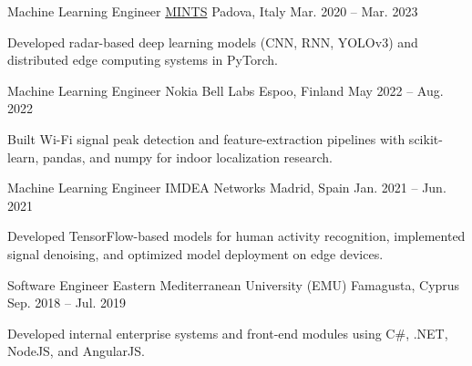 \begin{cventries}
  \cventry
    {Machine Learning Engineer} %
    {\href{https://b5g-mints.eu/}{MINTS}} %
    {Padova, Italy} %
    {Mar. 2020 -- Mar. 2023} %
    {
      \begin{cvitems}
        \item {Developed radar-based deep learning models (CNN, RNN, YOLOv3) and distributed edge computing systems in PyTorch.}
      \end{cvitems}
    }

  \cventry
    {Machine Learning Engineer} %
    {Nokia Bell Labs} %
    {Espoo, Finland} %
    {May 2022 -- Aug. 2022} %
    {
      \begin{cvitems}
        \item {Built Wi-Fi signal peak detection and feature-extraction pipelines with scikit-learn, pandas, and numpy for indoor localization research.}
      \end{cvitems}
    }

  \cventry
    {Machine Learning Engineer} %
    {IMDEA Networks} %
    {Madrid, Spain} %
    {Jan. 2021 -- Jun. 2021} %
    {
      \begin{cvitems}
        \item {Developed TensorFlow-based models for human activity recognition, implemented signal denoising, and optimized model deployment on edge devices.}
      \end{cvitems}
    }

  \cventry
    {Software Engineer} %
    {Eastern Mediterranean University (EMU)} %
    {Famagusta, Cyprus} %
    {Sep. 2018 -- Jul. 2019} %
    {
      \begin{cvitems}
        \item {Developed internal enterprise systems and front-end modules using C\#, .NET, NodeJS, and AngularJS.}
      \end{cvitems}
    }

\end{cventries}
